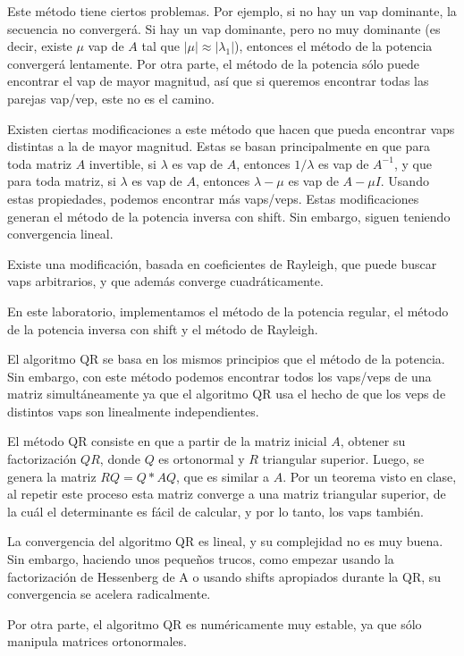 \documentclass[11pt]{article}
\begin{document}
Este método tiene ciertos problemas. Por ejemplo, si no hay un vap dominante,
la secuencia no convergerá. Si hay un vap dominante, pero no muy dominante
(es decir, existe $\mu$ vap de $A$ tal que $|\mu|\approx |\lambda_1|$), entonces
el método de la potencia convergerá lentamente. Por otra parte, el método de la
potencia sólo puede encontrar el vap de mayor magnitud, así que si queremos
encontrar todas las parejas vap/vep, este no es el camino.

Existen ciertas modificaciones a este método que hacen que pueda encontrar vaps
distintas a la de mayor magnitud. Estas se basan principalmente en que para toda
matriz $A$ invertible, si $\lambda$ es vap de $A$, entonces $1/\lambda$ es vap
de $A^{-1}$, y que para toda matriz, si $\lambda$ es vap de $A$, entonces
$\lambda-\mu$ es vap de $A-\mu I$. Usando estas propiedades, podemos encontrar
más vaps/veps. Estas modificaciones generan el método de la potencia inversa
con shift. Sin embargo, siguen teniendo convergencia lineal.

Existe una modificación, basada en coeficientes de Rayleigh, que puede buscar
vaps arbitrarios, y que además converge cuadráticamente.

En este laboratorio, implementamos el método de la potencia regular, el método
de la potencia inversa con shift y el método de Rayleigh.

El algoritmo QR se basa en los mismos principios que el método de la potencia.
Sin embargo, con este método podemos encontrar todos los vaps/veps de una matriz
simultáneamente ya que el algoritmo QR usa el hecho de que los veps de distintos
vaps son linealmente independientes.

El método QR consiste en que a partir de la matriz inicial $A$, obtener su
factorización $QR$, donde $Q$ es ortonormal y $R$ triangular superior. Luego, se
genera la matriz $RQ=Q*AQ$, que es similar a $A$. Por un teorema visto en clase,
al repetir este proceso esta matriz converge a una matriz triangular superior,
de la cuál el determinante es fácil de calcular, y por lo tanto, los vaps también.

La convergencia del algoritmo QR es lineal, y su complejidad no es muy buena.
Sin embargo, haciendo unos pequeños trucos, como empezar usando la factorización
de Hessenberg de A o usando shifts apropiados durante la QR, su convergencia se
acelera radicalmente.

Por otra parte, el algoritmo QR es numéricamente muy estable, ya que sólo
manipula matrices ortonormales.
\end{document}
